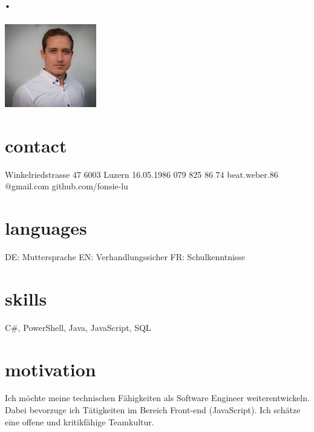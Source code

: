 \documentclass[]{cv-style} %
\begin{document}
\begin{aside}
\section{.}
\includegraphics[width=4cm]{portrait}
\section{contact}
Winkelriedstrasse 47
6003 Luzern
\vspace{0.8cm}
16.05.1986
\vspace{0.8cm}
079 825 86 74
\vspace{0.4cm}
beat.weber.86
@gmail.com
\vspace{0.4cm}
github.com/fonsie-lu
\section{languages}
DE:
Muttersprache
EN:
Verhandlungssicher 
FR:
Schulkenntnisse
\section{skills}
C\#, PowerShell, Java, JavaScript, SQL
\end{aside}
\section{motivation}
Ich möchte meine technischen Fähigkeiten als Software Engineer weiterentwickeln. Dabei bevorzuge ich Tätigkeiten im Bereich Front-end (JavaScript). Ich schätze eine offene und kritikfähige Teamkultur.
\end{document}
